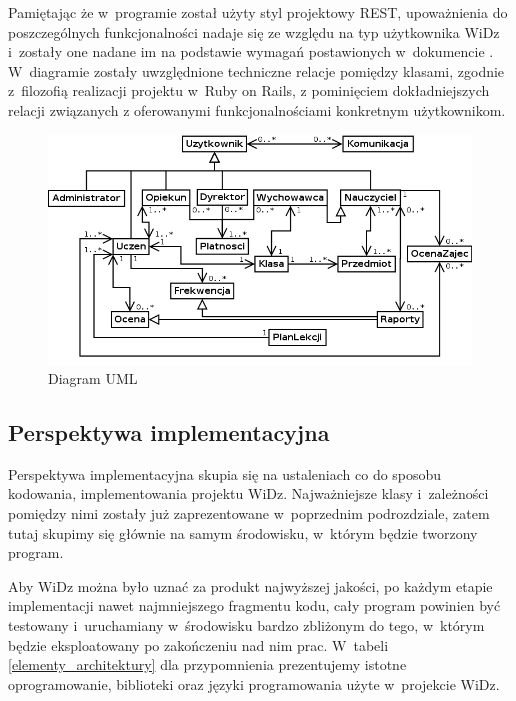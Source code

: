 \documentclass[12pt,leqno,twoside]{mwart}
\begin{document}
\indent Pamiętając że w~programie został użyty styl projektowy REST, upoważnienia do poszczególnych funkcjonalności nadaje się ze względu na typ użytkownika WiDz i~zostały one nadane im na podstawie wymagań postawionych w~dokumencie \cite{WYM}. W~diagramie zostały uwzględnione techniczne relacje pomiędzy klasami, zgodnie z~filozofią realizacji projektu w~Ruby on Rails, z pominięciem dokładniejszych relacji związanych z oferowanymi funkcjonalnościami konkretnym użytkownikom.
\begin{figure}[ht]
\center
\includegraphics[width=16cm]{uml_klas.png}
\caption{Diagram UML}
\label{fig:uml}
\end{figure}

\subsection{Perspektywa implementacyjna}
\noindent Perspektywa implementacyjna skupia się na ustaleniach co do sposobu kodowania, implementowania projektu WiDz. Najważniejsze klasy i~zależności pomiędzy nimi zostały już zaprezentowane w~poprzednim podrozdziale, zatem tutaj skupimy się głównie na samym środowisku, w~którym będzie tworzony program.


\indent Aby WiDz można było uznać za produkt najwyższej jakości, po każdym etapie implementacji nawet najmniejszego fragmentu kodu, cały program powinien być testowany i~uruchamiany w~środowisku bardzo zbliżonym do tego, w~którym będzie eksploatowany po zakończeniu nad nim prac. W~tabeli \ref{elementy_architektury} dla przypomnienia prezentujemy istotne oprogramowanie, biblioteki oraz języki programowania użyte w~projekcie WiDz.
\end{document}
